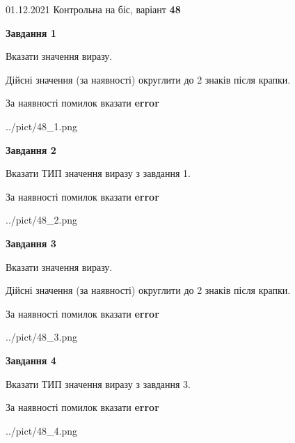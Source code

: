 \documentclass[11pt, ukrainian]{article}
\begin{document}
{01.12.2021 Контрольна на біс, варіант  \No \textbf { 48 }\par}
{
\begin {large}
{\begin {center}\textbf{Завдання 1}\end {center}}\par
Вказати значення виразу. \par
Дійсні значення (за наявності) округлити до 2 знаків після крапки. \par
За наявності помилок вказати \textbf{error}

\begin{center}
	{../pict/48_1.png}
\end{center}
\newpage

{\begin {center}\textbf{Завдання 2}\end {center}}\par
Вказати ТИП значення виразу з завдання 1. \par
За наявності помилок вказати \textbf{error}

\begin{center}
	{../pict/48_2.png}
\end{center}
\newpage

{\begin {center}\textbf{Завдання 3}\end {center}}\par
Вказати значення виразу. \par
Дійсні значення (за наявності) округлити до 2 знаків після крапки. \par
За наявності помилок вказати \textbf{error}

\begin{center}
	{../pict/48_3.png}
\end{center}
\newpage

{\begin {center}\textbf{Завдання 4}\end {center}}\par
Вказати ТИП значення виразу з завдання 3. \par
За наявності помилок вказати \textbf{error}

\begin{center}
	{../pict/48_4.png}
\end{center}
\newpage


\end{large}}
\end{document}
